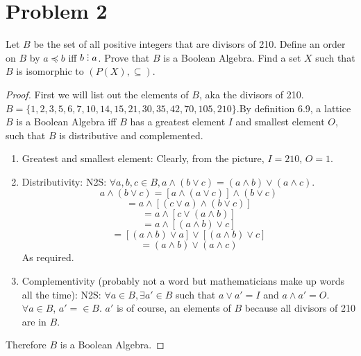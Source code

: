 \documentclass[12pt]{article}
\newcommand{\divby}{%
  \mathrel{\text{\vbox{\baselineskip.65ex\lineskiplimit0pt\hbox{.}\hbox{.}\hbox{.}}}}%
  }
\begin{document}
\section{Problem 2}
Let $B$ be the set of all positive integers that are divisors of 210. Define an order on $B$ by $a\preceq b$ iff $b\divby a$. Prove that $B$ is a Boolean Algebra. Find a set $X$ such that $B$ is isomorphic to $(P(X),\subseteq)$.
\begin{proof}First we will list out the elements of $B$, aka the divisors of 210. \newline $B=\{1,2,3,5,6,7,10,14,15,21,30,35,42,70,105,210\}$.\newline By definition 6.9, a lattice $B$ is a Boolean Algebra iff $B$ has a greatest element $I$ and smallest element $O$, such that $B$ is distributive and complemented.
    \newline {}\begin{enumerate}
    \item Greatest and smallest element: Clearly, from the picture, $I=210$, $O=1$.
    \item Distributivity: \newline N2S: $\forall a,b,c\in B, a\wedge(b\vee c)=(a\wedge b)\vee(a\wedge c)$. $$a\wedge(b\vee c)=[a\wedge(a\vee c)]\wedge(b\vee c)$$ $$=a\wedge[(c\vee a)\wedge(b\vee c)]$$ $$=a\wedge[c\vee (a\wedge b)]$$ $$=a\wedge[(a\wedge b)\vee c]$$ $$=[(a\wedge b)\vee a]\vee[(a\wedge b)\vee c]$$ $$=(a\wedge b)\vee(a\wedge c)$$ As required.
    \item Complementivity (probably not a word but mathematicians make up words all the time): \newline N2S: $\forall a\in B, \exists a'\in B$ such that $a\vee a'=I$ and $a\wedge a'=O$. $\forall a\in B$, $a'=$$\in B$. $a'$ is of course, an elements of $B$ because all divisors of 210 are in $B$.
\end{enumerate}
Therefore $B$ is a Boolean Algebra.
\end{proof}
\end{document}
